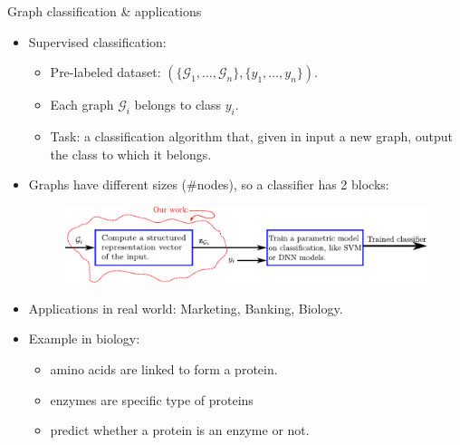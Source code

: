 \documentclass{beamer}
\begin{document}
\begin{frame}{Graph classification \& applications}
\footnotesize
    \begin{itemize}
        \item Supervised classification:
        \begin{itemize}
            \item Pre-labeled  dataset: $(\{\mathcal{G}_1,\ldots,\mathcal{G}_n\}, \{y_1,\ldots,y_n\})$.
            \item Each graph $\mathcal{G}_i$ belongs to class $y_i$.
            \item Task: a classification algorithm that, given in input a new graph, output the class to which it belongs.
        \end{itemize}
        \vfill
        \item  Graphs  have different sizes ($\#$nodes), so a classifier has 2 blocks:
        	\begin{figure}[H]
        	\centering
        	\includegraphics[scale=0.5]{figs/classifier.pdf}
        	\vfill
        \end{figure}

        \vfill 
       \item Applications in real world: Marketing, Banking, Biology.
       \vfill
       \item Example in biology:
       \begin{itemize}
           \item amino acids are linked to form a protein.
           \item enzymes are specific type of proteins 
           \item predict whether a protein is an enzyme or not. 
       \end{itemize}
     \end {itemize}
     
\end{frame}
\end{document}

